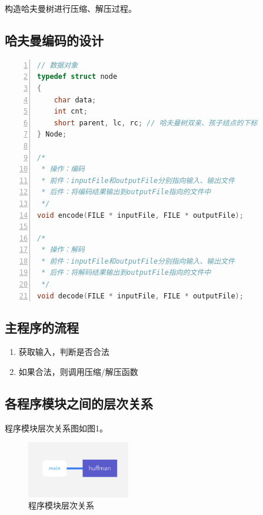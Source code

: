 \documentclass{article}
\begin{document}
构造哈夫曼树进行压缩、解压过程。

\subsection{哈夫曼编码的设计}

\begin{lstlisting}[language={C},
    numbers=left,
    numberstyle=\tiny\consolas,
    basicstyle=\small\consolas]
// 数据对象
typedef struct node
{
    char data;
    int cnt;
    short parent, lc, rc; // 哈夫曼树双亲、孩子结点的下标
} Node;

/*
 * 操作：编码
 * 前件：inputFile和outputFile分别指向输入、输出文件
 * 后件：将编码结果输出到outputFile指向的文件中
 */
void encode(FILE * inputFile, FILE * outputFile);

/*
 * 操作：解码
 * 前件：inputFile和outputFile分别指向输入、输出文件
 * 后件：将解码结果输出到outputFile指向的文件中
 */
void decode(FILE * inputFile, FILE * outputFile);
\end{lstlisting}

\subsection{主程序的流程}

\begin{enumerate}
    \item 获取输入，判断是否合法
    \item 如果合法，则调用压缩/解压函数
\end{enumerate}

\subsection{各程序模块之间的层次关系}

程序模块层次关系图如图1。

\begin{figure}[htbp]

    \centering\includegraphics[width=0.4\textwidth]{./Images/pic4_2_1.png}

    \caption{程序模块层次关系}

\end{figure}
\end{document}
